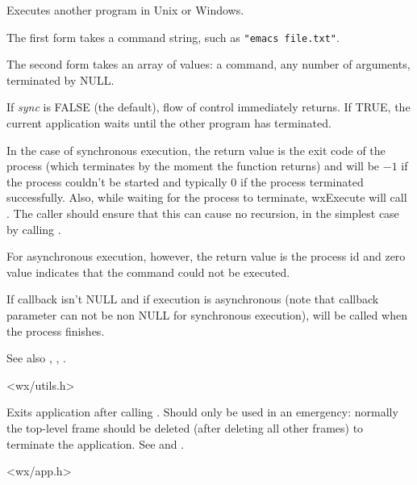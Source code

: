 Executes another program in Unix or Windows.

The first form takes a command string, such as {\tt "emacs file.txt"}.

The second form takes an array of values: a command, any number of
arguments, terminated by NULL.

If {\it sync} is FALSE (the default), flow of control immediately returns.
If TRUE, the current application waits until the other program has terminated.

In the case of synchronous execution, the return value is the exit code of
the process (which terminates by the moment the function returns) and will be
$-1$ if the process couldn't be started and typically 0 if the process
terminated successfully. Also, while waiting for the process to
terminate, wxExecute will call . The caller
should ensure that this can cause no recursion, in the simplest case by 
calling .

For asynchronous execution, however, the return value is the process id and
zero value indicates that the command could not be executed.

If callback isn't NULL and if execution is asynchronous (note that callback
parameter can not be non NULL for synchronous execution), 
 will be called when
the process finishes.

See also , , 
.


<wx/utils.h>

\label{wxexit}


Exits application after calling .
Should only be used in an emergency: normally the top-level frame
should be deleted (after deleting all other frames) to terminate the
application. See  and .


<wx/app.h>

\label{wxfatalerror}


